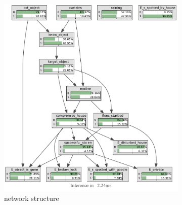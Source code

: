 \begin{figure}[h]
\begin{center}
\begin{subfigure}{.7\textwidth}
\includegraphics[width=\linewidth]{../experiments/StolenLaptopVision/bnImage/BNIMAGEStolenLaptopVision.pdf}
\caption{network structure}
\label{visionlaptopAcc}
\end{subfigure}
\end{center}

\begin{subfigure}{.5\textwidth}


\end{subfigure}
\end{figure}

